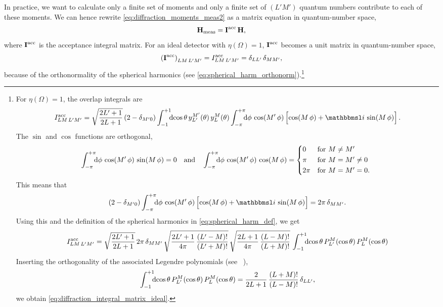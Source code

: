 In practice, we want to calculate only a finite set of moments and
only a finite set of $(L' M')$ quantum numbers contribute to each of
these moments.  We can hence rewrite
\cref{eq:diffraction_moments_meas2} as a matrix equation in
quantum-number space, \ie
\begin{equation}
  \bm{\mathrm{H}}_\text{meas}
  = \bm{\mathrm{I}}^\text{acc}\, \bm{\mathrm{H}},
\end{equation}
where $\bm{\mathrm{I}}^\text{acc}$ is the acceptance integral matrix.  For
an ideal detector with $\eta(\Omega) = 1$, $\bm{\mathrm{I}}^\text{acc}$
becomes a unit matrix in quantum-number space, \ie
\begin{equation}
  \label{eq:diffraction_integral_matrix_ideal}
  \rBrk{\mat{I}^\text{acc}}_{L M\, L' M'}
  = I^\text{acc}_{L M\, L' M'}
  = \delta_{L L'}\, \delta_{M M'},
\end{equation}
because of the orthonormality of the spherical harmonics (see
\cref{eq:spherical_harm_orthonorm}).\footnote{%
  For $\eta(\Omega) = 1$, the overlap integrals are
  \begin{equation}
    I^\text{acc}_{L M\, L' M'}
    = \sqrt{\frac{2 L' + 1}{2 L + 1}}\, (2 - \delta_{M' 0})
    \int_{-1}^{+1}\!\!\! \dif{\cos\theta}\, y_{L'}^{M'}(\theta)\, y_L^M(\theta)
    \int_{-\pi}^{+\pi}\!\!\! \dif{\phi}\, \cos(M'\, \phi) \sBrk[2]{\cos(M\, \phi) + \imag\, \sin(M\, \phi)}.
  \end{equation}
  The $\sin$ and $\cos$ functions are orthogonal, \ie
  \begin{equation}
    \int_{-\pi}^{+\pi}\!\!\! \dif{\phi}\, \cos(M'\, \phi)\, \sin(M\, \phi)
    = 0
    \quad\text{and}\quad
    \int_{-\pi}^{+\pi}\!\!\! \dif{\phi}\, \cos(M'\, \phi)\, \cos(M\, \phi)
    = \begin{cases*}
      0    & for $M \neq M'$ \\
      \pi  & for $M = M' \neq 0$ \\
      2\pi & for $M = M' = 0$.
    \end{cases*}
  \end{equation}
  This means that
  \begin{equation}
    (2 - \delta_{M' 0})
    \int_{-\pi}^{+\pi}\!\!\! \dif{\phi}\, \cos(M'\, \phi) \sBrk[2]{\cos(M\, \phi) + \imag\, \sin(M\, \phi)}
    = 2 \pi\, \delta_{M M'}.
  \end{equation}
  Using this and the definition of the spherical harmonics in
  \cref{eq:spherical_harm_def}, we get
  \begin{equation}
    I^\text{acc}_{L M\, L' M'}
    = \sqrt{\frac{2 L' + 1}{2 L + 1}}\, 2 \pi\, \delta_{M M'}\,
    \sqrt{\frac{2 L' + 1}{4 \pi}\, \frac{(L' - M)!}{(L' + M)!}}\,
    \sqrt{\frac{2 L + 1}{4 \pi}\, \frac{(L - M)!}{(L + M)!}}\,
    \int_{-1}^{+1}\!\!\! \dif{\cos\theta}\, P_{L'}^M(\cos\theta)\, P_L^M(\cos\theta)
  \end{equation}
  Inserting the orthogonality of the associated Legendre polynomials
  (see \eg\ ), \ie
  \begin{equation}
    \int_{-1}^{+1}\!\!\! \dif{\cos\theta}\, P_{L'}^M(\cos\theta)\, P_L^M(\cos\theta)
    = \frac{2}{2 L + 1}\, \frac{(L + M)!}{(L - M)!}\, \delta_{L L'},
  \end{equation}
  we obtain \cref{eq:diffraction_integral_matrix_ideal}.
}
